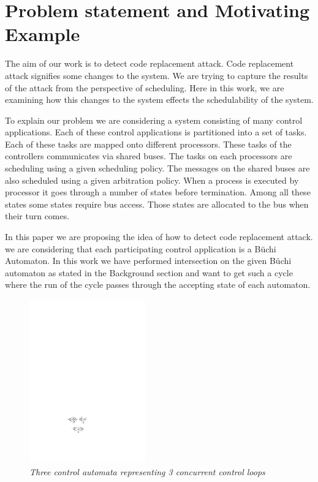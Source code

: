 \section{Problem statement and Motivating Example} \label{sec3}
\noindent
The aim of our work is to detect code replacement attack. Code replacement attack
signifies some changes to the system. We are trying to capture the results of the 
attack from the perspective of scheduling.  Here in this work, we are examining
how this changes to the system effects the schedulability of the system. 

To explain our problem we are considering a system consisting of many control
applications. Each of these control applications is partitioned into a set of
tasks. Each of these tasks are mapped onto different processors. These tasks 
of the controllers communicates via shared buses. The tasks on each processors
are scheduling using a given scheduling policy. The messages on the shared buses
are also scheduled using a given arbitration policy. When a process is executed by processor
it goes through a number of states before termination. Among all these states some
states require bus access. Those states are allocated to the bus when their turn
comes. 



In this paper we are proposing the idea of how to detect code replacement attack. we are considering that 
each participating control application is a B\"{u}chi Automaton. In this work we have performed intersection  
on the given B\"{u}chi automaton as stated in the Background section and want to get such a cycle where the
run of the cycle passes through the accepting state of each automaton.
\begin{figure}
\begin{center}
\includegraphics[width=50mm]{original.pdf}
\end{center}
\caption{{\em  Three control automata representing 3 concurrent control loops}}
\label{state}
\end{figure}

